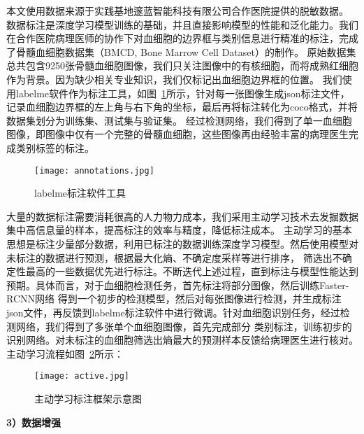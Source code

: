 本文使用数据来源于实践基地邃蓝智能科技有限公司合作医院提供的脱敏数据。
数据标注是深度学习模型训练的基础，并且直接影响模型的性能和泛化能力。我们在合作医院病理医师的协作下对血细胞的边界框与类别信息进行精准的标注，完成了骨髓血细胞数据集（BMCD, Bone Marrow Cell Dataset）的制作。
原始数据集总共包含9250张骨髓血细胞图像，我们只关注图像中的有核细胞，而将成熟红细胞作为背景。因为缺少相关专业知识，我们仅标记出血细胞边界框的位置。
我们使用labelme软件作为标注工具，如图~\ref{fig:annotations}所示，针对每一张图像生成json标注文件，记录血细胞边界框的左上角与右下角的坐标，最后再将标注转化为coco格式，并将数据集划分为训练集、测试集与验证集。
经过检测网络，我们得到了单一血细胞图像，即图像中仅有一个完整的骨髓血细胞，这些图像再由经验丰富的病理医生完成类别标签的标注。

\begin{figure}[htbp]
  \centering
  \texttt{[image: annotations.jpg]}
  \caption{labelme标注软件工具}
  \label{fig:annotations}
\end{figure}

大量的数据标注需要消耗很高的人力物力成本，我们采用主动学习\cite{ren2021survey}技术去发掘数据集中高信息量的样本，提高标注的效率与精度，降低标注成本。
主动学习的基本思想是标注少量部分数据，利用已标注的数据训练深度学习模型。然后使用模型对未标注的数据进行预测，根据最大化熵、不确定度采样等进行排序，
筛选出不确定性最高的一些数据优先进行标注。不断迭代上述过程，直到标注与模型性能达到预期。具体而言，对于血细胞检测任务，首先标注将部分图像，然后训练Faster-RCNN网络
得到一个初步的检测模型，然后对每张图像进行检测，并生成标注json文件，再反馈到labelme标注软件中进行微调。针对血细胞识别任务，经过检测网络，我们得到了多张单个血细胞图像，首先完成部分
类别标注，训练初步的识别网络。对未标注的血细胞筛选出熵最大的预测样本反馈给病理医生进行核对。主动学习流程如图~\ref{fig:active}所示：

\begin{figure}[htbp]
  \centering
  \texttt{[image: active.jpg]}
  \caption{主动学习标注框架示意图}
  \label{fig:active}
\end{figure}
\textbf{3）数据增强}

